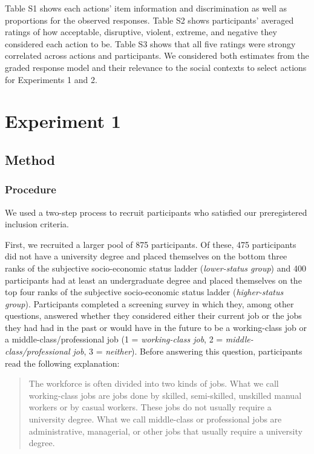 \documentclass[12pt, letterpaper]{article}
\begin{document}
Table S1 shows each actions' item information and discrimination as well
as proportions for the observed responses. Table S2 shows participants'
averaged ratings of how acceptable, disruptive, violent, extreme, and
negative they considered each action to be. Table S3 shows that all five
ratings were strongy correlated across actions and participants. We
considered both estimates from the graded response model and their
relevance to the social contexts to select actions for Experiments 1 and
2.

\hypertarget{experiment-1}{%
\section{Experiment 1}\label{experiment-1}}

\hypertarget{method}{%
\subsection{Method}\label{method}}

\hypertarget{procedure}{%
\subsubsection{Procedure}\label{procedure}}

We used a two-step process to recruit participants who satisfied our
preregistered inclusion criteria.

First, we recruited a larger pool of 875 participants. Of these, 475
participants did not have a university degree and placed themselves on
the bottom three ranks of the subjective socio-economic status ladder
(\emph{lower-status group}) and 400 participants had at least an
undergraduate degree and placed themselves on the top four ranks of the
subjective socio-economic status ladder (\emph{higher-status group}).
Participants completed a screening survey in which they, among other
questions, answered whether they considered either their current job or
the jobs they had had in the past or would have in the future to be a
working-class job or a middle-class/professional job (1 =
\emph{working-class job}, 2 = \emph{middle-class/professional job}, 3 =
\emph{neither}). Before answering this question, participants read the
following explanation:

\begin{quote}
The workforce is often divided into two kinds of jobs. What we call
working-class jobs are jobs done by skilled, semi-skilled, unskilled
manual workers or by casual workers. These jobs do not usually require a
university degree. What we call middle-class or professional jobs are
administrative, managerial, or other jobs that usually require a
university degree.
\end{quote}
\end{document}
